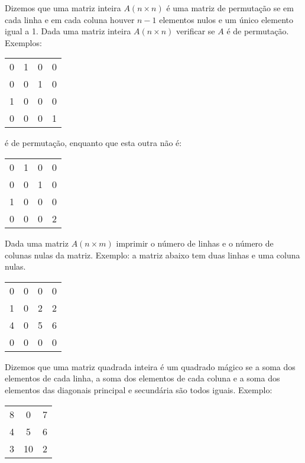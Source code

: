 \item Dizemos que uma  matriz inteira $A (n \times n)$ é 
uma matriz de permutação
se em cada linha e em cada  coluna houver $n-1$ elementos nulos e um único
elemento igual a 1.  Dada uma matriz inteira $A (n \times  n)$ verificar se 
$A$ é de permutação. Exemplos:

\begin{center}
\begin{tabular}{cccc}
0 & 1 & 0 & 0 \\ 
0 & 0 & 1 & 0 \\
1 & 0 & 0 & 0 \\
0 & 0 & 0 & 1 \\
\end{tabular}
\end{center}

é de permutação, enquanto que esta outra não é:

\begin{center}
\begin{tabular}{cccc}
0 & 1 & 0 & 0 \\
0 & 0 & 1 & 0 \\
1 & 0 & 0 & 0 \\
0 & 0 & 0 & 2 \\
\end{tabular}
\end{center}

\item Dada uma matriz  $A (n \times m)$ 
imprimir o número de  linhas e o número de
colunas nulas da matriz. Exemplo: a matriz abaixo 
tem duas linhas e uma coluna nulas. 

\begin{center}
\begin{tabular}{cccc}
0 & 0 & 0 & 0 \\
1 & 0 & 2 & 2 \\
4 & 0 & 5 & 6 \\
0 & 0 & 0 & 0 \\
\end{tabular}
\end{center}



\item  Dizemos  que uma matriz  quadrada inteira é  um quadrado mágico  se a
soma dos elementos de cada linha,  a soma dos elementos de cada coluna e
a  soma dos  elementos das  diagonais principal  e secundária  são todos
iguais.  Exemplo:

\begin{center}
\begin{tabular}{ccc}
8 &  0 & 7 \\
4 &  5 & 6 \\
3 & 10 & 2 \\
\end{tabular}
\end{center}

